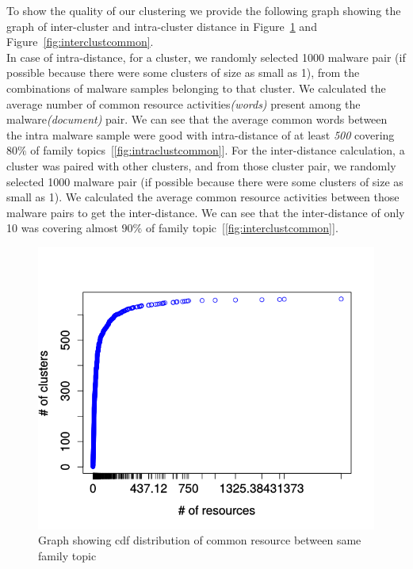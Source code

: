 To show the quality of our clustering we provide the following graph showing the graph of inter-cluster and intra-cluster distance in Figure~\ref{fig:intraclustcommon} and Figure~\ref{fig:interclustcommon}.\\
In case of intra-distance, for a cluster, we randomly selected 1000 malware pair (if possible because there were some clusters of size as small as 1), from the combinations of malware samples belonging to that cluster.
We calculated the average number of common resource activities\textit{(words)} present among the malware\textit{(document)} pair.
We can see that the average common words between the intra malware sample were good with intra-distance of at least \emph{500} covering $80\%$ of family topics~[\autoref{fig:intraclustcommon}].
For the inter-distance calculation, a cluster was paired with other clusters, and from those cluster pair,
we randomly selected 1000 malware pair (if possible because there were some clusters of size as small as 1).
We calculated the average common resource activities between those malware pairs to get the inter-distance.
We can see that the inter-distance of only 10 was covering almost $90\%$ of family topic~[\autoref{fig:interclustcommon}].
\begin{figure}[htbp]
\begin{center}
  \includegraphics[scale=0.7]{figures/intra_clustered_common.png}
\end{center}
\captionsetup{font=small}
\caption{ Graph showing cdf distribution of common resource between same family topic}
\label{fig:intraclustcommon}
\end{figure}
